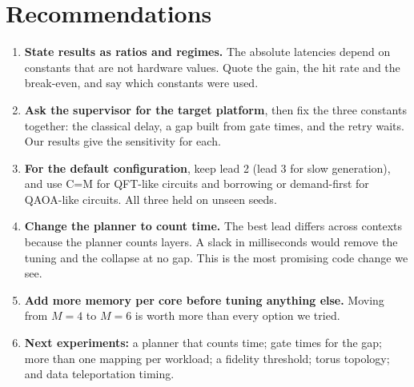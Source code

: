\documentclass[11pt,a4paper]{report}
\begin{document}
\chapter{Recommendations}
\begin{enumerate}
\item \textbf{State results as ratios and regimes.} The absolute latencies depend on constants that are not hardware values. Quote the gain, the hit rate and the break-even, and say which constants were used.
\item \textbf{Ask the supervisor for the target platform}, then fix the three constants together: the classical delay, a gap built from gate times, and the retry waits. Our results give the sensitivity for each.
\item \textbf{For the default configuration}, keep lead 2 (lead 3 for slow generation), and use C=M for QFT-like circuits and borrowing or demand-first for QAOA-like circuits. All three held on unseen seeds.
\item \textbf{Change the planner to count time.} The best lead differs across contexts because the planner counts layers. A slack in milliseconds would remove the tuning and the collapse at no gap. This is the most promising code change we see.
\item \textbf{Add more memory per core before tuning anything else.} Moving from $M=4$ to $M=6$ is worth more than every option we tried.
\item \textbf{Next experiments:} a planner that counts time; gate times for the gap; more than one mapping per workload; a fidelity threshold; torus topology; and data teleportation timing.
\end{enumerate}
\end{document}
